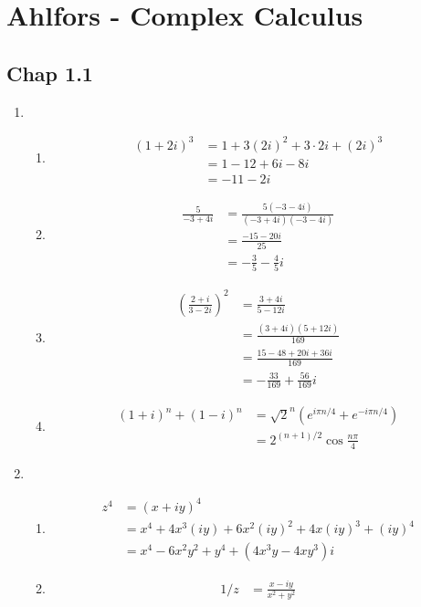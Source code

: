 \documentclass[../main.tex]{subfiles}
\begin{document}
\section{{\sc Ahlfors} - Complex Calculus}
\subsection{Chap 1.1}
\begin{enumerate}
\item
\begin{enumerate}
\item\begin{align}
(1+2i)^3
&=1+3(2i)^2+3\cdot2i+(2i)^3\\
&=1-12+6i-8i\\
&=-11-2i
\end{align}

\item\begin{align}
\frac{5}{-3+4i}
&=\frac{5(-3-4i)}{(-3+4i)(-3-4i)}\\
&=\frac{-15-20i}{25}\\
&=-\frac{3}{5}-\frac{4}{5}i
\end{align}

\item\begin{align}
\left(\frac{2+i}{3-2i}\right)^2
&=\frac{3+4i}{5-12i}\\
&=\frac{(3+4i)(5+12i)}{169}\\
&=\frac{15-48+20i+36i}{169}\\
&=-\frac{33}{169}+\frac{56}{169}i
\end{align}

\item\begin{align}
(1+i)^n+(1-i)^n
&=\sqrt{2}^n\left(e^{i\pi n/4}+e^{-i\pi n/4}\right)\\
&=2^{(n+1)/2}\cos\frac{n\pi}{4}
\end{align}
\end{enumerate}

\item
\begin{enumerate}
\item
\begin{align}
z^4
&=(x+iy)^4\\
&=x^4+4x^3(iy)+6x^2(iy)^2+4x(iy)^3+(iy)^4\\
&=x^4-6x^2y^2+y^4+(4x^3y-4xy^3)i
\end{align}

\item\begin{align}
1/z
&=\frac{x-iy}{x^2+y^2}
\end{align}


\end{enumerate}
\end{enumerate}
\end{document}
